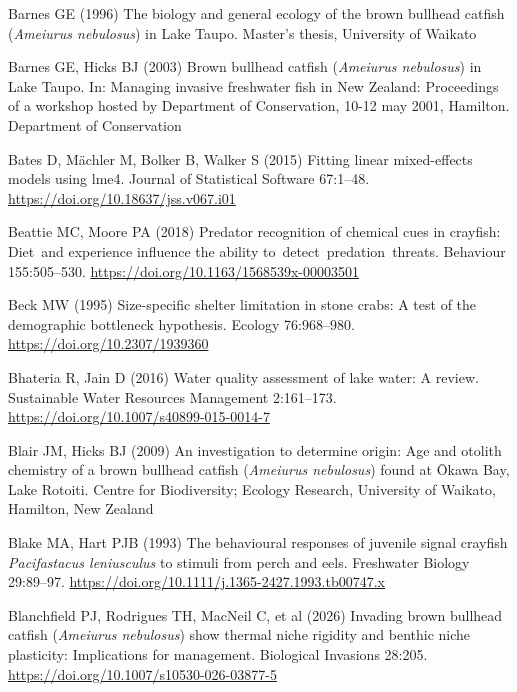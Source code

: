 \documentclass[
  12pt,
  a4paper,
  oneside]{scrbook}
\newlength{\cslhangindent}
\newenvironment{CSLReferences}[2] %
 {\begin{list}{}{%
  \setlength{\itemindent}{0pt}
  \setlength{\leftmargin}{0pt}
  \setlength{\parsep}{0pt}
  \ifodd #1
   \setlength{\leftmargin}{\cslhangindent}
   \setlength{\itemindent}{-1\cslhangindent}
  \fi
  \setlength{\itemsep}{#2\baselineskip}}}
 {\end{list}}
\renewenvironment{CSLReferences}[2]
   {\begin{list}{}{%
    \setlength{\itemindent}{0pt}
    \setlength{\leftmargin}{0pt}
    \setlength{\parsep}{0pt}
    \ifodd #1
     \setlength{\leftmargin}{\cslhangindent}
     \setlength{\itemindent}{-1\cslhangindent}
    \fi
    \setlength{\itemsep}{0.3\baselineskip}}}
   {\end{list}}%
\begin{document}
\begin{CSLReferences}{1}{1}
Barnes GE (1996) The biology and general ecology of the brown bullhead
catfish ({\emph{Ameiurus nebulosus}}) in {Lake Taupo}. Master's thesis,
University of Waikato

Barnes GE, Hicks BJ (2003) Brown bullhead catfish ({\emph{Ameiurus
nebulosus}}) in {Lake Taupo}. In: Managing invasive freshwater fish in
{New Zealand}: Proceedings of a workshop hosted by {Department of
Conservation}, 10-12 may 2001, {Hamilton}. Department of Conservation

Bates D, Mächler M, Bolker B, Walker S (2015) Fitting linear
mixed-effects models using {lme4}. Journal of Statistical Software
67:1--48. \url{https://doi.org/10.18637/jss.v067.i01}

Beattie MC, Moore PA (2018) Predator recognition of chemical cues in
crayfish: Diet~and experience influence the ability
to~detect~predation~threats. Behaviour 155:505--530.
\url{https://doi.org/10.1163/1568539x-00003501}

Beck MW (1995) Size-specific shelter limitation in stone crabs: A test
of the demographic bottleneck hypothesis. Ecology 76:968--980.
\url{https://doi.org/10.2307/1939360}

Bhateria R, Jain D (2016) Water quality assessment of lake water: A
review. Sustainable Water Resources Management 2:161--173.
\url{https://doi.org/10.1007/s40899-015-0014-7}

Blair JM, Hicks BJ (2009) An investigation to determine origin: Age and
otolith chemistry of a brown bullhead catfish ({\emph{Ameiurus
nebulosus}}) found at {Ōkawa Bay, Lake Rotoiti}. Centre for
Biodiversity; Ecology Research, University of Waikato, Hamilton, New
Zealand

Blake MA, Hart PJB (1993) The behavioural responses of juvenile signal
crayfish {\emph{Pacifastacus leniusculus}} to stimuli from perch and
eels. Freshwater Biology 29:89--97.
\url{https://doi.org/10.1111/j.1365-2427.1993.tb00747.x}

Blanchfield PJ, Rodrigues TH, MacNeil C, et al (2026) Invading brown
bullhead catfish ({\emph{Ameiurus nebulosus}}) show thermal niche
rigidity and benthic niche plasticity: Implications for management.
Biological Invasions 28:205.
\url{https://doi.org/10.1007/s10530-026-03877-5}


\end{CSLReferences}
\end{document}
